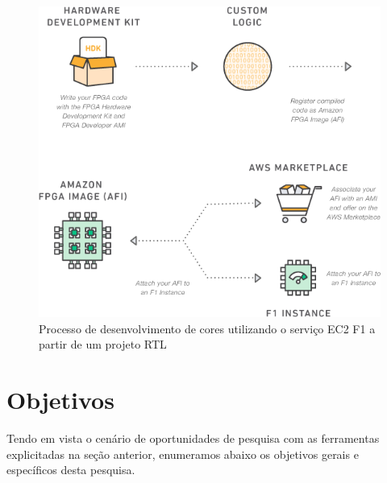 \documentclass[conference]{IEEEtran}
\begin{document}
	\begin{figure}[htbp]
	\centerline{\includegraphics[scale=0.400]{fig3.png}}
	\caption{Processo de desenvolvimento de cores utilizando o serviço EC2 F1 a partir de um projeto RTL}
	\label{aws}
\end{figure}

\section{Objetivos}
Tendo em vista o cenário de oportunidades de pesquisa com as ferramentas 
explicitadas na seção anterior, enumeramos abaixo os objetivos
gerais e específicos desta pesquisa.\\
\end{document}
